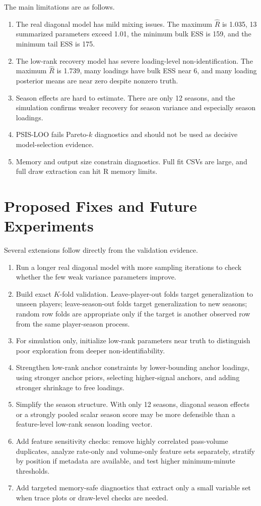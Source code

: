 \documentclass[11pt]{article}
\begin{document}
The main limitations are as follows.

\begin{enumerate}
\item The real diagonal model has mild mixing issues. The maximum
\(\widehat{R}\) is 1.035, 13 summarized parameters exceed 1.01, the minimum
bulk ESS is 159, and the minimum tail ESS is 175.
\item The low-rank recovery model has severe loading-level non-identification.
The maximum \(\widehat{R}\) is 1.739, many loadings have bulk ESS near 6, and
many loading posterior means are near zero despite nonzero truth.
\item Season effects are hard to estimate. There are only 12 seasons, and the
simulation confirms weaker recovery for season variance and especially season
loadings.
\item PSIS-LOO fails Pareto-\(k\) diagnostics and should not be used as decisive
model-selection evidence.
\item Memory and output size constrain diagnostics. Full fit CSVs are large,
and full draw extraction can hit R memory limits.
\end{enumerate}

\section{Proposed Fixes and Future Experiments}

Several extensions follow directly from the validation evidence.

\begin{enumerate}
\item Run a longer real diagonal model with more sampling iterations to check
whether the few weak variance parameters improve.
\item Build exact \(K\)-fold validation. Leave-player-out folds target
generalization to unseen players; leave-season-out folds target generalization
to new seasons; random row folds are appropriate only if the target is another
observed row from the same player-season process.
\item For simulation only, initialize low-rank parameters near truth to
distinguish poor exploration from deeper non-identifiability.
\item Strengthen low-rank anchor constraints by lower-bounding anchor loadings,
using stronger anchor priors, selecting higher-signal anchors, and adding
stronger shrinkage to free loadings.
\item Simplify the season structure. With only 12 seasons, diagonal season
effects or a strongly pooled scalar season score may be more defensible than a
feature-level low-rank season loading vector.
\item Add feature sensitivity checks: remove highly correlated pass-volume
duplicates, analyze rate-only and volume-only feature sets separately, stratify
by position if metadata are available, and test higher minimum-minute
thresholds.
\item Add targeted memory-safe diagnostics that extract only a small variable
set when trace plots or draw-level checks are needed.
\end{enumerate}
\end{document}
